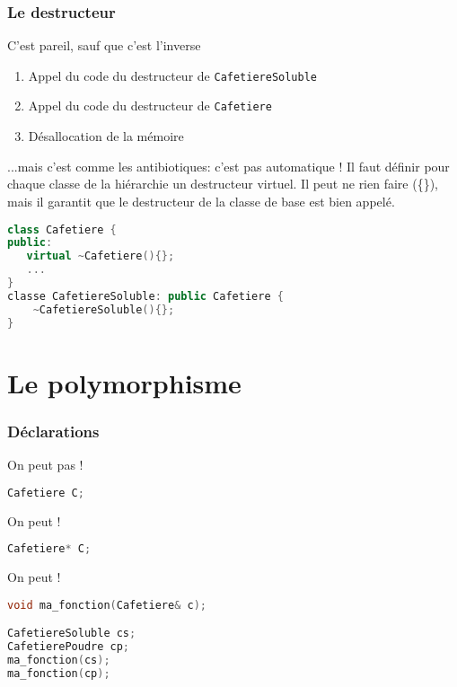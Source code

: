 \documentclass{beamer}
\begin{document}
\begin{frame}[fragile=singleslide,shrink=20]
\frametitle {Le destructeur}

\begin{block}{C'est pareil, sauf que c'est l'inverse}

\begin{enumerate}
\item Appel du code du destructeur de \tt{CafetiereSoluble}
\item Appel du code du destructeur de \tt{Cafetiere}
\item Désallocation de la mémoire
\end{enumerate}
\end{block}

\begin{block}{...mais c'est comme les antibiotiques: c'est pas automatique !}
Il faut définir pour chaque classe de la hiérarchie
un destructeur virtuel. Il peut ne rien faire (\{\}), mais il garantit que le destructeur de la classe de base est bien appelé.
\end{block}

\begin{lstlisting}[language=c++]
class Cafetiere {
public:
   virtual ~Cafetiere(){};
   ...
}
classe CafetiereSoluble: public Cafetiere {
    ~CafetiereSoluble(){};
}
\end{lstlisting}
\end{frame}

\section{Le polymorphisme}

\begin{frame}[fragile=singleslide,shrink=20]
\frametitle {Déclarations}

\begin{block}{On peut pas !}
\begin{lstlisting}[language=c++]
Cafetiere C;
\end{lstlisting}
\end{block}

\begin{block}{On peut !}
\begin{lstlisting}[language=c++]
Cafetiere* C;
\end{lstlisting}
\end{block}

\begin{block}{On peut !}
\begin{lstlisting}[language=c++]
void ma_fonction(Cafetiere& c);

CafetiereSoluble cs;
CafetierePoudre cp;
ma_fonction(cs);
ma_fonction(cp);
\end{lstlisting}
\end{block}
\end{frame}
\end{document}

